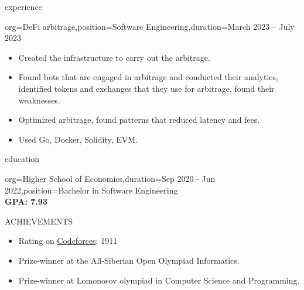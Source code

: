 \documentclass{resume}
\begin{document}
\begin{ResumeSection}{experience}
\begin{ResumeSubsection}{org=DeFi arbitrage,position={Software Engineering},duration=March 2023 – July 2023}
\begin{itemize}
            \item {
                Created the infrastructure to carry out the arbitrage.
            }

            \item {
                Found bots that are engaged in arbitrage and conducted their analytics, identified tokens and exchanges that they use for arbitrage, found their weaknesses.
            }

            \item {
                Optimized arbitrage, found patterns that reduced latency and fees.
            }

            \item {
                Used Go, Docker, Solidity, EVM.
            }
        \end{itemize}
    \end{ResumeSubsection}
\end{ResumeSection}

\begin{ResumeSection}{education}
    \begin{ResumeSubsection}{org={Higher School of Economics},duration={Sep 2020 - Jun 2022},position={Bachelor in Software Engineering}}
        \\\bf GPA: 7.93 
    \end{ResumeSubsection}
\end{ResumeSection}

\begin{ResumeSection}{ACHIEVEMENTS}
    \begin{itemize}
        \item Rating on \href{https://codeforces.com/profile/nikita4109}{Codeforces}: 1911
        \item Prize-winner at the All-Siberian Open Olympiad Informatics. 
        \item Prize-winner at Lomonosov olympiad in Computer Science and Programming.
    \end{itemize}
\end{ResumeSection}
\end{document}
